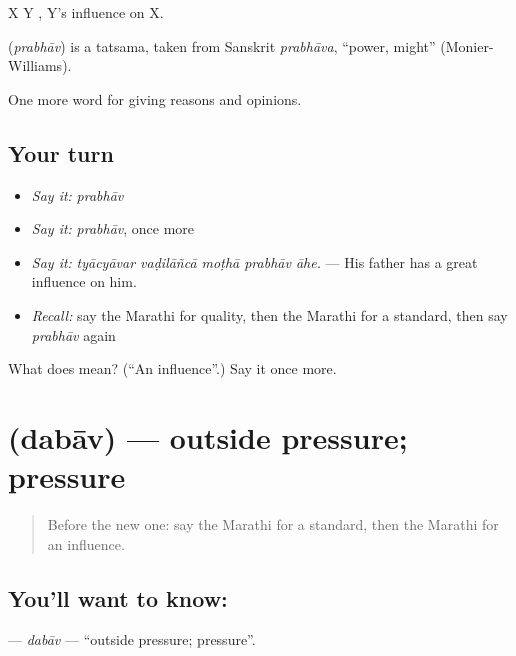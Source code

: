 X  Y  , Y's influence on X.

\begin{cousinweb}
\textbf{} (\emph{prabhāv}) is a tatsama, taken from Sanskrit \emph{prabhāva}, \textquotedblleft{}power, might\textquotedblright{} (Monier-Williams).
\end{cousinweb}

\begin{grammarlens}[title={What you've built}]
One more word for giving reasons and opinions.
\end{grammarlens}

\subsection*{Your turn}
\begin{itemize}
\raggedright
  \item \emph{Say it:} \emph{prabhāv}
  \item \emph{Say it:} \emph{prabhāv}, once more
  \item \emph{Say it:} \emph{tyācyāvar vaḍilāñcā moṭhā prabhāv āhe.} — His father has a great influence on him.
  \item \emph{Recall:} say the Marathi for quality, then the Marathi for a standard, then say \emph{prabhāv} again
\end{itemize}

\begin{tcolorbox}[breakable,colback=teal!4,colframe=teal!35!black,title={Before you move on}]
What does  mean? (\textquotedblleft{}An influence\textquotedblright{}.) Say it once more.
\end{tcolorbox}
\section[\texorpdfstring{\mr{दबाव} (dabāv)}{दबाव (dabāv)}]{ (dabāv) — outside pressure; pressure}

\label{lesson:MR-C377-dabav}



\begin{quote}
Before the new one: say the Marathi for a standard, then the Marathi for an influence.
\end{quote}

\subsection*{You'll want to know: }
\textbf{} — \emph{dabāv} — \textquotedblleft{}outside pressure; pressure\textquotedblright{}.

